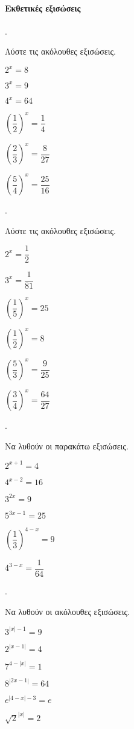 \documentclass[11pt,a4paper,twocolumn]{article}
\newcounter{askhsh}
\newcommand{\askhsh}{\large\theaskhsh.\ \addtocounter{askhsh}{1}}
\begin{document}
\paragraph{Εκθετικές εξισώσεις}
\askhsh Λύστε τις ακόλουθες εξισώσεις.
\begin{multicols}{2}
\begin{alist}
\item $2^x=8$
\item $3^x=9$
\item $4^x=64$
\item $\left(\dfrac{1}{2}\right)^x=\dfrac{1}{4}$
\item $\left(\dfrac{2}{3}\right)^x=\dfrac{8}{27}$
\item $\left(\dfrac{5}{4}\right)^x=\dfrac{25}{16}$
\end{alist}
\end{multicols}
\askhsh Λύστε τις ακόλουθες εξισώσεις.
\begin{multicols}{2}
\begin{alist}
\item $2^x=\dfrac{1}{2}$
\item $3^x=\dfrac{1}{81}$
\item $\left(\dfrac{1}{5}\right)^x=25$
\item $\left(\dfrac{1}{2}\right)^x=8$
\item $\left(\dfrac{5}{3}\right)^x=\dfrac{9}{25}$
\item $\left(\dfrac{3}{4}\right)^x=\dfrac{64}{27}$
\end{alist}
\end{multicols}
\askhsh Να λυθούν οι παρακάτω εξισώσεις.
\begin{multicols}{2}
\begin{alist}
\item $2^{x+1}=4$
\item $4^{x-2}=16$
\item $3^{2x}=9$
\item $5^{3x-1}=25$
\item $\left(\dfrac{1}{3}\right)^{4-x}=9$
\item $4^{3-x}=\dfrac{1}{64}$
\end{alist}
\end{multicols}
\askhsh Να λυθούν οι ακόλουθες εξισώσεις.
\begin{multicols}{2}
\begin{alist}
\item $3^{|x|-1}=9$
\item $2^{|x-1|}=4$
\item $7^{4-|x|}=1$
\item $8^{|2x-1|}=64$
\item $e^{|4-x|-3}=e$
\item $\sqrt{2}^{|x|}=2$
\end{alist}
\end{multicols}
\end{document}
